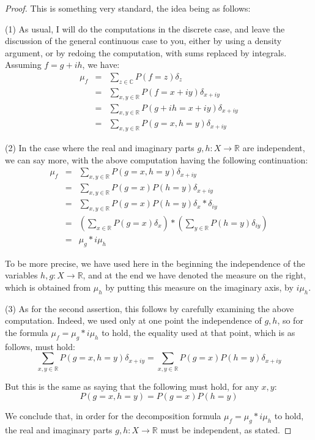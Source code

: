 \documentclass[12pt]{amsbook}
\begin{document}
\begin{proof}
This is something very standard, the idea being as follows:

\medskip

(1) As usual, I will do the computations in the discrete case, and leave the discussion of the general continuous case to you, either by using a density argument, or by redoing the computation, with sums replaced by integrals. Assuming $f=g+ih$, we have:
\begin{eqnarray*}
\mu_f
&=&\sum_{z\in\mathbb C}P(f=z)\delta_z\\
&=&\sum_{x,y\in\mathbb R}P(f=x+iy)\delta_{x+iy}\\
&=&\sum_{x,y\in\mathbb R}P(g+ih=x+iy)\delta_{x+iy}\\
&=&\sum_{x,y\in\mathbb R}P(g=x,h=y)\delta_{x+iy}
\end{eqnarray*}

(2) In the case where the real and imaginary parts $g,h:X\to\mathbb R$ are independent, we can say more, with the above computation having the following continuation:
\begin{eqnarray*}
\mu_f
&=&\sum_{x,y\in\mathbb R}P(g=x,h=y)\delta_{x+iy}\\
&=&\sum_{x,y\in\mathbb R}P(g=x)P(h=y)\delta_{x+iy}\\
&=&\sum_{x,y\in\mathbb R}P(g=x)P(h=y)\delta_x*\delta_{iy}\\
&=&\left(\sum_{x\in\mathbb R}P(g=x)\delta_x\right)*\left(\sum_{y\in\mathbb R}P(h=y)\delta_{iy}\right)\\
&=&\mu_g*i\mu_h
\end{eqnarray*}

To be more precise, we have used here in the beginning the independence of the variables $h,g:X\to\mathbb R$, and at the end we have denoted the measure on the right, which is obtained from $\mu_h$ by putting this measure on the imaginary axis, by $i\mu_h$.

\medskip

(3) As for the second assertion, this follows by carefully examining the above computation. Indeed, we used only at one point the independence of $g,h$, so for the formula $\mu_f=\mu_g*i\mu_h$ to hold, the equality used at that point, which is as follows, must hold:
$$\sum_{x,y\in\mathbb R}P(g=x,h=y)\delta_{x+iy}
=\sum_{x,y\in\mathbb R}P(g=x)P(h=y)\delta_{x+iy}$$

But this is the same as saying that the following must hold, for any $x,y$:
$$P(g=x,h=y)=P(g=x)P(h=y)$$

We conclude that, in order for the decomposition formula $\mu_f=\mu_g*i\mu_h$ to hold, the real and imaginary parts $g,h:X\to\mathbb R$ must be independent, as stated.
\end{proof}
\end{document}
